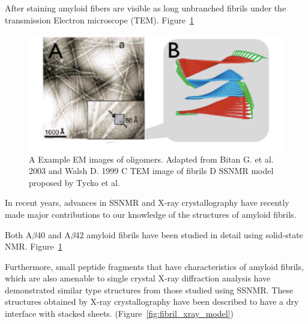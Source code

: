 After staining amyloid fibers are visible as long unbranched fibrils under the transmission Electron microscope (TEM). Figure~\ref{fig:fibril_TEM_SSNMR}
\begin{figure}
  \centering
  \includegraphics[width=6in]{figures/introduction/fibril_TEM_SSNMR.pdf}
  \caption[Characteristic cross-$\beta$ spacings from X-ray fibre diffraction studies of amyloid fibrils]{A Example EM images of oligomers.  Adapted from Bitan G. et al. 2003 and Walsh D. 1999 C TEM image of fibrils D SSNMR model proposed by Tycko et al.  }
  \label{fig:fibril_TEM_SSNMR}
\end{figure}


In recent years, advances in SSNMR and X-ray crystallography have recently made major contributions to our knowledge of the structures of amyloid fibrils.

Both A$\beta$40 and A$\beta$42 amyloid fibrils have been studied in detail using solid-state NMR. Figure~\ref{fig:fibril_TEM_SSNMR}

Furthermore, small peptide fragments that have characteristics of amyloid fibrils, which are also amenable to single crystal X-ray diffraction analysis have demonstrated similar type structures from those studied using SSNMR.  These structures obtained by X-ray crystallography have been described to have a dry interface with stacked sheets. (Figure~\ref{fig:fibril_xray_model})

